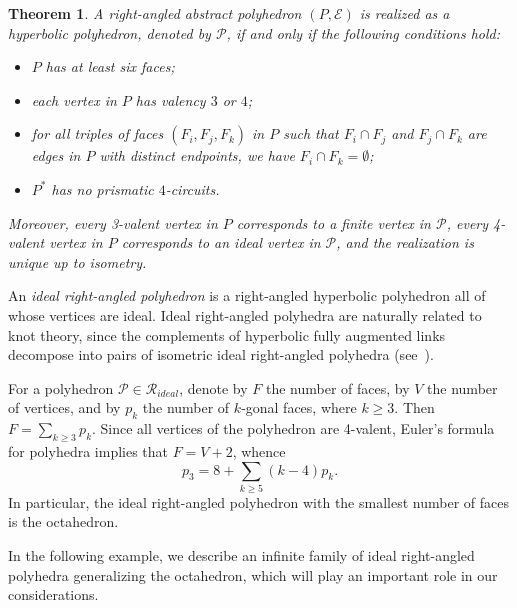 \documentclass{amsart}
\newtheorem{theorem}{Theorem}[section]
\begin{document}
\begin{theorem} \label{theorem2.1}
A right-angled abstract polyhedron $(P, \mathcal E)$ is realized as a hyperbolic polyhedron, denoted by $\mathcal P$, if and only if the following conditions hold:
\begin{itemize}
\item[(1)] $P$ has at least six faces;
\item[(2)] each vertex in $P$ has valency $3$ or $4$; 
\item[(3)] for all triples of faces $(F_i, F_j, F_k)$ in $P$ such that $F_i \cap F_j$ and $F_j \cap F_k$ are edges in $P$ with distinct endpoints, we have $F_i \cap F_k = \emptyset$;
\item[(4)] $P^*$ has no prismatic $4$-circuits. 
\end{itemize}
Moreover, every 3-valent vertex in $P$ corresponds to a finite vertex in $\mathcal P$, every 4-valent vertex in $P$ corresponds to an ideal vertex in $\mathcal P$, and the realization is unique up to isometry.
\end{theorem} 
	
An \textit{ideal right-angled polyhedron} is a right-angled hyperbolic polyhedron all of whose vertices are ideal. Ideal right-angled polyhedra are naturally related to knot theory, since the complements of hyperbolic fully augmented links decompose into pairs of isometric ideal right-angled polyhedra (see~\cite{La04, Pur2011,VeEg24}).
	
For a polyhedron $\mathcal P \in \mathcal R_{ideal}$, denote by $F$ the number of faces, by $V$ the number of vertices, and by $p_k$ the number of $k$-gonal faces, where $k \geq 3$. Then $F = \sum_{k\geq 3} p_k$. Since all vertices of the polyhedron are 4-valent, Euler's formula for polyhedra implies that $F = V + 2$, whence
\begin{equation} \label{eqn1}
p_3 = 8 + \sum_{k \geq 5} (k-4) p_k. 
\end{equation} 	
In particular, the ideal right-angled polyhedron with the smallest number of faces is the octahedron. 	
	
In the following example, we describe an infinite family of ideal right-angled polyhedra generalizing the octahedron, which will play an important role in our considerations.
	
\end{document}
